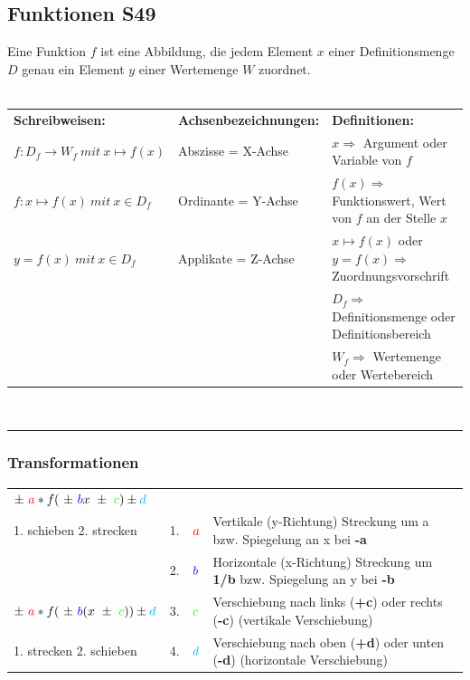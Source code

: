 \subsection{Funktionen \color{red} S49}
\label{sub:allgemeines}
Eine Funktion $f$ ist eine Abbildung, die jedem Element $x$ einer Definitionsmenge $D$ genau ein Element $y$ einer Wertemenge $W$ zuordnet.\\
\\
\begin{tabular}{p{4cm}p{3cm}p{5cm}}
	\textbf{Schreibweisen:} & 								\textbf{Achsenbezeichnungen:} & 	\textbf{Definitionen:}\\
	$f:D_{f}\rightarrow W_{f} \ mit\ x \mapsto f(x)$ &		Abszisse = X-Achse &				$x\Rightarrow$ Argument oder Variable von $f$\\	
	$f:x \mapsto f(x) \ mit\ x\in D_{f}$ &					Ordinante = Y-Achse &				$f(x)\Rightarrow$ Funktionswert, Wert von $f$ an der Stelle $x$\\
	$y=f(x) \ mit\ x \in D_{f}$ &							Applikate = Z-Achse &				$x\mapsto f(x)$ oder$y=f(x)\Rightarrow$ Zuordnungsvorschrift\\
																								&&$D_{f}\Rightarrow$ Definitionsmenge oder Definitionsbereich\\
																								&&$W_{f} \Rightarrow$ Wertemenge oder Wertebereich\\	
\end{tabular}\\


\hrule
\subsubsection{Transformationen}
\label{subsub: Funktionen}

\begin{tabular}{p{4cm}p{1mm}p{1mm}p{10cm}}
	$\pm \ \color{red} a \color{black} \ast f(\ \pm \ \color{blue} b\color{black}x\ \pm\ \color{green}c \color{black}) \pm \color{cyan}d$ \\
	
	1. schieben 2. strecken & 1. & $\color{red}a$ &				Vertikale (y-Richtung) Streckung um a bzw. Spiegelung an x bei \textbf{-a}\\	
							& 2. & $\color{blue}b$ &			Horizontale (x-Richtung) Streckung um \textbf{1/b} bzw. Spiegelung an y bei \textbf{-b}\\
							
	$\pm \ \color{red} a \color{black} \ast f(\ \pm \ \color{blue} b\color{black}(x\ \pm\ \color{green}c \color{black})) \pm \color{cyan}d$
							& 3. & $\color{green}c$ &				Verschiebung nach links (\textbf{+c}) oder rechts (\textbf{-c}) (vertikale Verschiebung)\\
	1. strecken 2. schieben & 4. & $\color{cyan}d$ &				Verschiebung nach oben (\textbf{+d}) oder unten (\textbf{-d}) (horizontale Verschiebung)\\	
\end{tabular}
